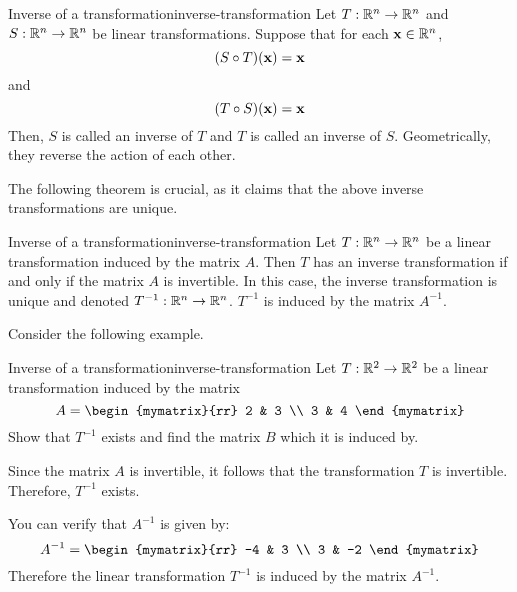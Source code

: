 \begin{definition}{Inverse of a transformation}{inverse-transformation}
Let $T: \mathbb{R}^n \to \mathbb{R}^n$ and $S:\mathbb{R}^n \to \mathbb{R}^n$ be linear transformations. Suppose that for each $\mbox{\bf x} \in \mathbb{R}^n$, 
\[
(S \circ T)(\mbox{\bf x}) = \mbox{\bf x}
\]
and 
\[
(T \circ S)(\mbox{\bf x}) = \mbox{\bf x}
\]
Then, $S$ is called an inverse of $T$  and $T$ is called an inverse of $S$. Geometrically, they reverse the action of each other. 
\end{definition}

The following theorem is crucial, as it claims that the above inverse transformations are unique. 

\begin{theorem}{Inverse of a transformation}{inverse-transformation}
Let $T:\mathbb{R}^n \to \mathbb{R}^n$ be a linear transformation induced by the matrix $A$. Then $T$ has an inverse transformation if and only if the matrix $A$ is invertible. In this case, the inverse transformation is unique and denoted $T^{-1}: \mathbb{R}^n \to \mathbb{R}^n$. $T^{-1}$ is induced by the matrix $A^{-1}$. 
\end{theorem}

Consider the following example. 

\begin{example}{Inverse of a transformation}{inverse-transformation}
Let $T: \mathbb{R}^2 \to \mathbb{R}^2$ be a linear transformation induced by the matrix 
\[
A = 
\begin{mymatrix}{rr}
2 & 3 \\
3 & 4
\end{mymatrix}
\]
Show that $T^{-1}$ exists and find the matrix $B$ which it is induced by. 
\end{example}

\begin{solution}
Since the matrix $A$ is invertible, it follows that the transformation $T$ is invertible. Therefore, $T^{-1}$ exists. 

You can verify that $A^{-1}$ is given by:
\[
A^{-1}
=
\begin{mymatrix}{rr}
-4 & 3 \\
3 & -2
\end{mymatrix}
\]
Therefore the linear transformation $T^{-1}$ is induced by the matrix $A^{-1}$. 
\end{solution}
